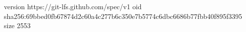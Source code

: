 version https://git-lfs.github.com/spec/v1
oid sha256:69bbed0fb67874d2c60a4c277b6c350e7b5774c6dbc6686b77fbb40f895f3395
size 2553
